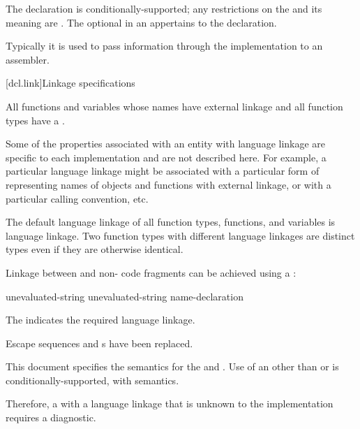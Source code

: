 The  declaration is conditionally-supported;
any restrictions on the  and
its meaning are .
The optional  in
an  appertains to the  declaration.
\begin{note}
Typically it is used to pass information through the implementation to
an assembler.
\end{note}

[dcl.link]{Linkage specifications}%

\pnum
All functions and variables whose names have external linkage
and all function types
have a .
\begin{note}
Some of the properties associated with an entity with language linkage
are specific to each implementation and are not described here. For
example, a particular language linkage might be associated with a
particular form of representing names of objects and functions with
external linkage, or with a particular calling convention, etc.
\end{note}
The default language linkage of all function types, functions, and
variables is \Cpp{} language linkage. Two function types with
different language linkages are distinct types even if they are
otherwise identical.

\pnum
Linkage between \Cpp{} and  non-\Cpp{} code fragments can
be achieved using a :

%
%
%
\begin{bnf}
\br
     unevaluated-string \terminal{\{}  \terminal{\}}\br
     unevaluated-string name-declaration
\end{bnf}

The  indicates the required language linkage.
\begin{note}
Escape sequences and s
have been replaced.
\end{note}
This document specifies the semantics for the
  and .
Use of an 
other than  or  is conditionally-supported,
with  semantics.
\begin{note}
Therefore, a  with a language linkage
that is unknown to the implementation requires a diagnostic.
\end{note}

